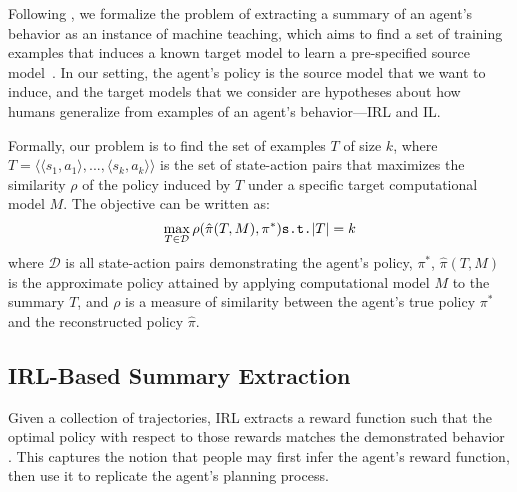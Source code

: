 \documentclass{article}
\begin{document}
Following \cite{huang17communicate}, we formalize the problem of extracting a summary of an agent's behavior as an instance of machine teaching, which aims to find a set of training examples that induces a known target model to learn a pre-specified source model~\cite{zhu2015machine}. In our setting, the agent's policy is the source model that we want to induce, and the target models that we consider are hypotheses about how humans generalize from examples of an agent's behavior---IRL and IL.
 
Formally, our problem is to find the set of examples $T$ of size $k$, where $T = \langle \langle s_{1},a_{1} \rangle,...,\langle s_{k},a_{k} \rangle \rangle$ is the set of state-action pairs that maximizes the similarity $\rho$ of the policy induced by $T$ under a specific target computational model $M$. The objective can be written as:
\begin{equation}
 \max_{T \in \mathcal{D}} \rho( \hat{\pi}(T,M), \pi^*)\\
 \texttt{s.t.} |T| = k
\end{equation}
where $\mathcal{D}$ is all state-action pairs demonstrating the agent's policy, $\pi^{*}$, $\hat{\pi}(T,M)$ is the approximate policy attained by applying computational model $M$ to the summary $T$, and $\rho$ is a measure of similarity between the agent's true policy $\pi^{*}$ and the reconstructed policy $\hat{\pi}$.

\subsection{IRL-Based Summary Extraction}
Given a collection of trajectories, IRL extracts a reward function such that the optimal policy with respect to those rewards matches the demonstrated behavior \cite{ng2000algorithms}. This captures the notion that people may first infer the agent's reward function, then use it to replicate the agent's planning process.
\end{document}

